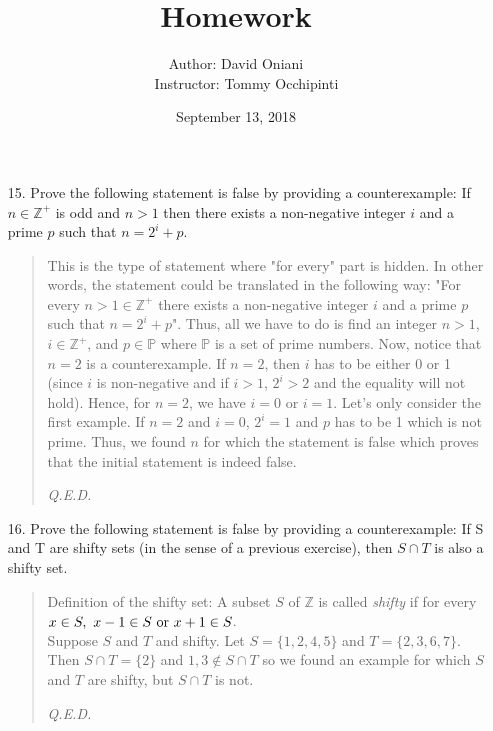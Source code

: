 \documentclass[12pt, a4paper]{article}                      %
\title{\bf{Homework \textnumero 4}}
\author{Author: David Oniani
\\
\ \ \ Instructor: Tommy Occhipinti}
\date{September 13, 2018}
\begin{document}
\maketitle


\begin{enumerate}
\item[15.]
Prove the following statement is false by providing a counterexample: If $n \in \mathbb{Z}^+$ is odd
and $n > 1$ then there exists a non-negative integer $i$ and a prime $p$ such that $n = 2^i + p$.
\\

\begin{quote}
This is the type of statement where "for every" part is hidden. In other words,
the statement could be translated in the following way: "For every $n > 1 \in \mathbb{Z}^+$
there exists a non-negative integer $i$ and a prime $p$ such that
$n = 2^i + p$". Thus, all we have to do is find an integer $n > 1$, $i \in \mathbb{Z}^+$, and $p \in \mathbb{P}$ where $\mathbb{P}$ is a set
of prime numbers. Now, notice that $n = 2$ is a counterexample. If $n = 2$, then $i$ has to be either 0 or 1 (since $i$ is non-negative and
if $i > 1$, $2^i > 2$ and the equality will not hold).
Hence, for $n = 2$, we have $i = 0$ or $i = 1$. Let's only consider the first example.
If $n = 2$ and $i = 0$, $2^i = 1$ and $p$ has to be 1 which is not prime. Thus, we found $n$ for which the statement is false which
proves that the initial statement is indeed false.
\begin{flushright}
\textit{Q.E.D.}
\end{flushright}
\end{quote}

\item[16.]
Prove the following statement is false by providing a counterexample:
If S and T are shifty sets (in the sense of a previous exercise), then $S \cap T$ is also a shifty set.
\begin{quote}
Definition of the shifty set: A subset $S$ of $\mathbb{Z}$ is called \textit{shifty} if for every $x \in S, \ x-1 \in S \ \textnormal{or} \ x + 1 \in S$.\\

Suppose $S$ and $T$ and shifty. Let $S = \{1,2,4,5\}$ and $T = \{2,3,6,7\}$.
Then $S \cap T = \{2\}$ and $1, 3 \notin S \cap T$ so we found an example for which
$S$ and $T$ are shifty, but $S \cap T$ is not.
\begin{flushright}
\textit{Q.E.D.}
\end{flushright}
\end{quote}


\end{enumerate}
\end{document}
